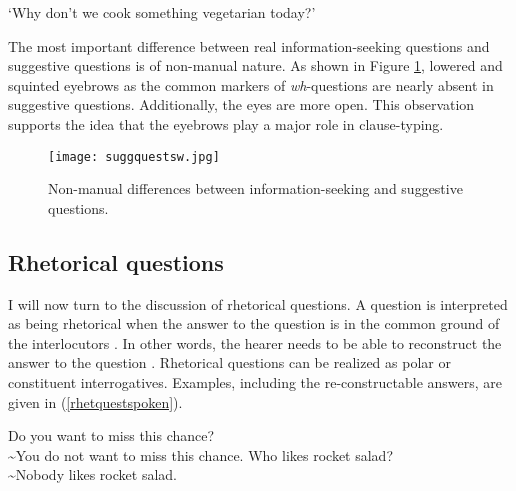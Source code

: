 \begin{exe}
\ex {}
\glt `Why don't we cook something vegetarian today?' \label{ex:suggquest}
\end{exe}

\noindent The most important difference between real information-seeking questions and suggestive questions is of non-manual nature. As shown in Figure \ref{suggquest}, lowered and squinted eyebrows as the common markers of \textit{wh}-questions are nearly absent in suggestive questions. Additionally, the eyes are more open. This observation supports the idea that the eyebrows play a major role in clause-typing.

\begin{figure}[bt]
\centering
	\texttt{[image: suggquestsw.jpg]}
	\caption{Non-manual differences between information-seeking and suggestive questions. }
	\label{suggquest}
\end{figure}




\subsection{Rhetorical questions}\label{rhetq}
I will now turn to the discussion of rhetorical questions. A question is interpreted as being rhetorical when the answer to the question is in the common ground of the interlocutors \citep{caponigro2007rhetorical}. In other words, the hearer needs to be able to reconstruct the answer to the question \citep{truckenbrodt2004strukturbedeutung}. Rhetorical questions can be realized as polar or constituent interrogatives. Examples, including the re-constructable answers, are given in (\ref{rhetquestspoken}).

\begin{exe}
\ex\label{rhetquestspoken}\begin{xlist}
\ex Do you want to miss this chance? \\
\textasciitilde You do not want to miss this chance. \label{polarrhet}
\ex Who likes rocket salad? \\
\textasciitilde Nobody likes rocket salad. \label{constituentrhet}
\end{xlist}
\end{exe}

